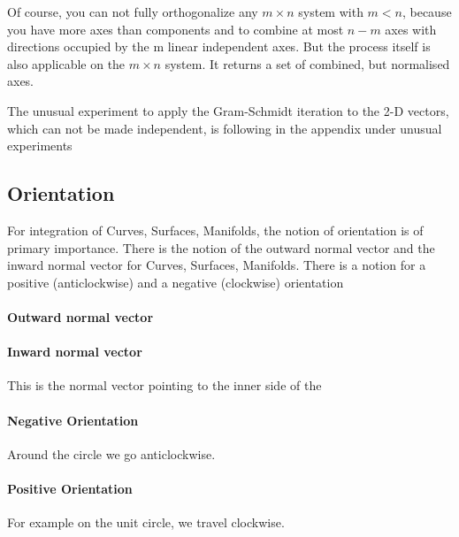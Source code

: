 \documentclass[a4paper]{article}
\begin{document}
Of course, you can not fully orthogonalize any $m \times n$ system with $m \lt n$, because you have more axes than components and to combine at most $n-m$ axes with directions occupied by the m linear independent axes. But the process itself is also applicable on the $m \times n$ system. It returns a set of combined, but normalised axes.


The unusual experiment to apply the Gram-Schmidt iteration to the 2-D vectors, which can not be made independent, is following in the appendix under unusual experiments



\subsection{Orientation}

For integration of Curves, Surfaces, Manifolds, the notion of orientation is of primary importance. There is the notion of the outward normal vector and the inward normal vector for Curves, Surfaces, Manifolds. There is a notion for a positive (anticlockwise) and a negative (clockwise) orientation


\paragraph{Outward normal vector}



\paragraph{Inward normal vector}

This is the normal vector pointing to the inner side of the 


\paragraph{Negative Orientation}

Around the circle we go anticlockwise. 

\paragraph{Positive Orientation}

For example on the unit circle, we travel clockwise.




\end{document}
